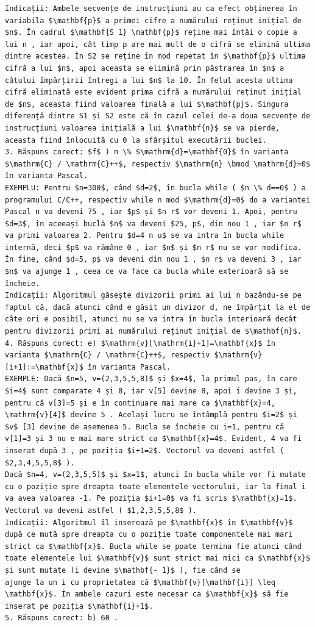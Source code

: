 \documentclass[10pt]{article}
\begin{document}
\begin{verbatim}
Indicații: Ambele secvențe de instrucțiuni au ca efect obținerea în variabila $\mathbf{p}$ a primei cifre a numărului reținut inițial de $n$. În cadrul $\mathbf{S 1} \mathbf{p}$ reține mai întâi o copie a lui n , iar apoi, cât timp p are mai mult de o cifră se elimină ultima dintre acestea. În S2 se reține în mod repetat în $\mathbf{p}$ ultima cifră a lui $n$, apoi aceasta se elimină prin păstrarea în $n$ a câtului împărțirii întregi a lui $n$ la 10. În felul acesta ultima cifră eliminată este evident prima cifră a numărului reținut inițial de $n$, aceasta fiind valoarea finală a lui $\mathbf{p}$. Singura diferență dintre S1 și S2 este că în cazul celei de-a doua secvențe de instrucțiuni valoarea inițială a lui $\mathbf{n}$ se va pierde, aceasta fiind înlocuită cu 0 la sfârșitul executării buclei.
3. Răspuns corect: $f$ ) n \% $\mathrm{d}=\mathbf{0}$ în varianta $\mathrm{C} / \mathrm{C}++$, respectiv $\mathrm{n} \bmod \mathrm{d}=0$ în varianta Pascal.
EXEMPLU: Pentru $n=300$, când $d=2$, în bucla while ( $n \% d==0$ ) a programului C/C++, respectiv while n mod $\mathrm{d}=0$ do a variantei Pascal n va deveni 75 , iar $p$ și $n r$ vor deveni 1. Apoi, pentru $d=3$, în aceeași buclă $n$ va deveni $25, p$, din nou 1 , iar $n r$ va primi valoarea 2. Pentru $d=4 n u$ se va intra în bucla while internă, deci $p$ va rămâne 0 , iar $n$ și $n r$ nu se vor modifica. În fine, când $d=5, p$ va deveni din nou 1 , $n r$ va deveni 3 , iar $n$ va ajunge 1 , ceea ce va face ca bucla while exterioară să se încheie.
Indicații: Algoritmul găsește divizorii primi ai lui n bazându-se pe faptul că, dacă atunci când e găsit un divizor d, ne împărțit la el de câte ori e posibil, atunci nu se va intra în bucla interioară decât pentru divizorii primi ai numărului reținut inițial de $\mathbf{n}$.
4. Răspuns corect: e) $\mathrm{v}[\mathrm{i}+1]=\mathbf{x}$ în varianta $\mathrm{C} / \mathrm{C}++$, respectiv $\mathrm{v}[i+1]:=\mathbf{x}$ în varianta Pascal.
EXEMPLE: Dacă $n=5, v=(2,3,5,5,8)$ și $x=4$, la primul pas, în care $i=4$ sunt comparate 4 și 8, iar v[5] devine 8, apoi i devine 3 și, pentru că v[3]=5 și e în continuare mai mare ca $\mathbf{x}=4, \mathrm{v}[4]$ devine 5 . Același lucru se întâmplă pentru $i=2$ și $v$ [3] devine de asemenea 5. Bucla se încheie cu i=1, pentru că v[1]=3 și 3 nu e mai mare strict ca $\mathbf{x}=4$. Evident, 4 va fi inserat după 3 , pe poziția $i+1=2$. Vectorul va deveni astfel ( $2,3,4,5,5,8$ ).
Dacă $n=4, v=(2,3,5,5)$ și $x=1$, atunci în bucla while vor fi mutate cu o poziție spre dreapta toate elementele vectorului, iar la final i va avea valoarea -1. Pe poziția $i+1=0$ va fi scris $\mathbf{x}=1$. Vectorul va deveni astfel ( $1,2,3,5,5,8$ ).
Indicații: Algoritmul îl inserează pe $\mathbf{x}$ în $\mathbf{v}$ după ce mută spre dreapta cu o poziție toate componentele mai mari strict ca $\mathbf{x}$. Bucla while se poate termina fie atunci când toate elementele lui $\mathbf{v}$ sunt strict mai mici ca $\mathbf{x}$ și sunt mutate (i devine $\mathbf{- 1}$ ), fie când se
ajunge la un i cu proprietatea că $\mathbf{v}[\mathbf{i}] \leq \mathbf{x}$. În ambele cazuri este necesar ca $\mathbf{x}$ să fie inserat pe poziția $\mathbf{i}+1$.
5. Răspuns corect: b) 60 .


\end{verbatim}
\end{document}
